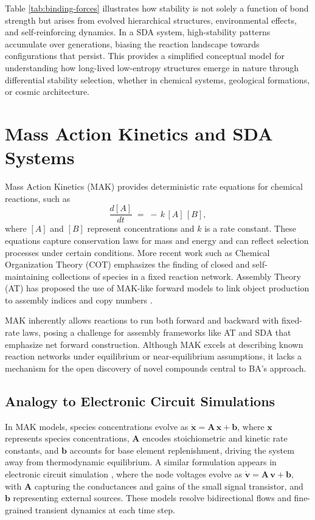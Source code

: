 \documentclass[preprint,12pt]{elsarticle}
\begin{document}
Table \ref{tab:binding-forces} illustrates how stability is not solely a function of bond strength but arises from evolved hierarchical structures, environmental effects, and self-reinforcing dynamics. In a SDA system, high-stability patterns accumulate over generations, biasing the reaction landscape towards configurations that persist. This provides a simplified conceptual model for understanding how long-lived low-entropy structures emerge in nature through differential stability selection, whether in chemical systems, geological formations, or cosmic architecture.


\section{Mass Action Kinetics and SDA Systems}
\label{subsec:mak-forward-limitations}

Mass Action Kinetics (MAK) \cite{TuranyiTomlin2014} provides deterministic rate equations for chemical reactions, such as
\[
\frac{d[A]}{dt} \;=\; -\,k\, [A]\,[B],
\]
where $[A]$ and $[B]$ represent concentrations and $k$ is a rate constant. These equations capture conservation laws for mass and energy and can reflect selection processes under certain conditions. More recent work such as Chemical Organization Theory (COT) \cite{DittrichFenizio2005} emphasizes the finding of closed and self-maintaining collections of species in a fixed reaction network. Assembly Theory (AT) has proposed the use of MAK-like forward models to link object production to assembly indices and copy numbers \cite{walker2023nature}.

MAK inherently allows reactions to run both forward and backward with fixed-rate laws, posing a challenge for assembly frameworks like AT and SDA that emphasize net forward construction. Although MAK excels at describing known reaction networks under equilibrium or near-equilibrium assumptions, it lacks a mechanism for the open discovery of novel compounds central to BA’s approach.

\subsection{Analogy to Electronic Circuit Simulations}
\label{subsec:spice-analogy}

In MAK models, species concentrations evolve as
$\dot{\mathbf{x}} = \mathbf{A}\,\mathbf{x} + \mathbf{b}$, where \(\mathbf{x}\) represents species concentrations, \(\mathbf{A}\) encodes stoichiometric and kinetic rate constants, and \(\mathbf{b}\) accounts for base element replenishment, driving the system away from thermodynamic equilibrium. A similar formulation appears in electronic circuit simulation \cite{SpiceRef}, where the node voltages evolve as
$\dot{\mathbf{v}} = \mathbf{A}\,\mathbf{v} + \mathbf{b}$, with \(\mathbf{A}\) capturing the conductances and gains of the small signal transistor, and \(\mathbf{b}\) representing external sources. These models resolve bidirectional flows and fine-grained transient dynamics at each time step.
\end{document}

